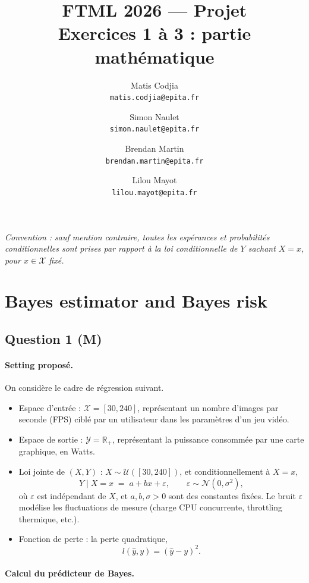 \documentclass[11pt]{article}
\title{\textbf{FTML 2026 --- Projet}\\[0.3em]\large Exercices 1 à 3 : partie mathématique}
\author{Matis Codjia\\ \texttt{matis.codjia@epita.fr}
  \and
   Simon Naulet\\ \texttt{simon.naulet@epita.fr}
  \and
  Brendan Martin\\ \texttt{brendan.martin@epita.fr}
  \and
   Lilou Mayot\\ \texttt{lilou.mayot@epita.fr}}
\date{}
\theoremstyle{remark}
\newcommand{\X}{\mathcal{X}}
\newcommand{\Y}{\mathcal{Y}}
\newcommand{\R}{\mathbb{R}}
\begin{document}
\maketitle
\vspace{-2em}

\tableofcontents

\bigskip
\noindent\textit{Convention : sauf mention contraire, toutes les espérances et probabilités conditionnelles sont prises par rapport à la loi conditionnelle de $Y$ sachant $X=x$, pour $x \in \X$ fixé.}

\section{Bayes estimator and Bayes risk}

\subsection*{Question 1 (M)}

\paragraph{Setting proposé.}
On considère le cadre de régression suivant.

\begin{itemize}
  \item Espace d'entrée : $\X = [30, 240]$, représentant un nombre d'images par seconde (FPS) ciblé par un utilisateur dans les paramètres d'un jeu vidéo.
  \item Espace de sortie : $\Y = \R_+$, représentant la puissance consommée par une carte graphique, en Watts.
  \item Loi jointe de $(X,Y)$ : $X \sim \mathcal{U}([30,240])$, et conditionnellement à $X=x$,
  \[
    Y \mid X = x \;=\; a + bx + \varepsilon, \qquad \varepsilon \sim \mathcal{N}(0, \sigma^2),
  \]
  où $\varepsilon$ est indépendant de $X$, et $a, b, \sigma > 0$ sont des constantes fixées. Le bruit $\varepsilon$ modélise les fluctuations de mesure (charge CPU concurrente, throttling thermique, etc.).
  \item Fonction de perte : la perte quadratique,
  \[
    l(\hat y, y) = (\hat y - y)^2.
  \]
\end{itemize}

\paragraph{Calcul du prédicteur de Bayes.}
\end{document}
